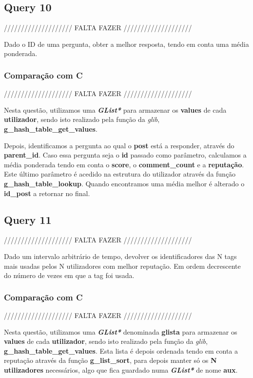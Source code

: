 \documentclass[a4paper]{article}
\begin{document}
\subsection{Query 10}

//////////////////// FALTA FAZER ////////////////////

Dado o ID de uma pergunta, obter a melhor resposta, tendo em conta
uma média ponderada.

\subsubsection{Comparação com C}

//////////////////// FALTA FAZER ////////////////////

Nesta questão, utilizamos uma \textit{\textbf{GList*}} para armazenar 
os \textbf{values} de cada \textbf{utilizador}, sendo isto realizado
pela função da \textit{glib}, \textbf{g\_hash\_table\_get\_values}.

Depois, identificamos a pergunta ao qual o \textbf{post} está a responder,
através do \textbf{parent\_id}. Caso essa pergunta seja o \textbf{id}
passado como parâmetro, calculamos a média ponderada tendo em conta o
\textbf{score}, o \textbf{comment\_count} e a \textbf{reputação}. Este
último parâmetro é acedido na estrutura do utilizador através da função
\textbf{g\_hash\_table\_lookup}. Quando encontramos uma média melhor é
alterado o \textbf{id\_post} a retornar no final.

\subsection{Query 11}

//////////////////// FALTA FAZER ////////////////////

Dado um intervalo arbitrário de tempo, devolver os identificadores das N tags
mais usadas pelos N utilizadores com melhor reputação. Em ordem decrescente 
do número de vezes em que a tag foi usada.

\subsubsection{Comparação com C}

//////////////////// FALTA FAZER ////////////////////

Nesta questão, utilizamos uma \textit{\textbf{GList*}} denominada 
\textbf{glista} para armazenar os \textbf{values} de cada \textbf{utilizador},
sendo isto realizado pela função da \textit{glib}, 
\textbf{g\_hash\_table\_get\_values}. Esta lista é depois ordenada tendo em
conta a reputação através da função \textbf{g\_list\_sort}, para depois 
manter só os \textbf{N utilizadores} necessários, algo que fica guardado
numa \textit{\textbf{GList*}} de nome \textbf{aux}.
\end{document}
